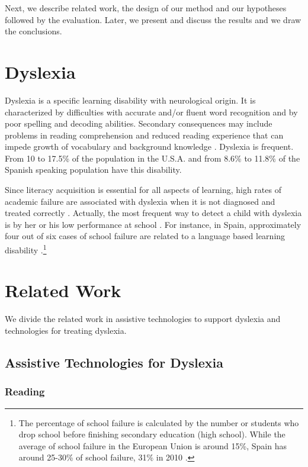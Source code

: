 \documentclass[letterpaper]{sig-alternate-2013}
\begin{document}
Next, we describe related work, the design of our method and our hypotheses followed by the evaluation. Later, we present and discuss the results and we draw the conclusions. 

\section{Dyslexia}
Dyslexia is a specific learning disability with neurological origin. It is characterized by difficulties with accurate and/or fluent word recognition and by poor spelling and decoding abilities. Secondary consequences may include problems in reading comprehension and reduced reading experience that can impede growth of vocabulary and background knowledge \cite{Lyon2003}. Dyslexia is frequent. From 10 to 17.5\% of the population in the U.S.A. \cite{CommitteeonLearningDisabilities1987} and from 8.6\% \cite{Jimenez2009} to 11.8\% \cite{Carrillo2011} of the Spanish speaking population have this disability.

Since literacy acquisition is essential for all aspects of learning, high rates of academic failure are associated with dyslexia when it is not diagnosed and treated correctly \cite{Gabrieli2009}. Actually, the most frequent way to detect a child with dyslexia is by her or his low performance at school \cite{Carrillo2011}. For instance, in Spain, approximately four out of six cases of school failure are related to a language based learning disability \cite{FEDIS}.\footnote{The percentage of school failure is calculated by the number or students who drop school before finishing secondary education (high school). While the average of school failure in the European Union is around 15\%, Spain has around 25-30\% of school failure, 31\% in 2010 \cite{Enguita2010}.} 


\section{Related Work}
We divide the related work in assistive technologies to support dyslexia and technologies for treating dyslexia.

\subsection{Assistive Technologies for Dyslexia}
\subsubsection{Reading} 
\end{document}
